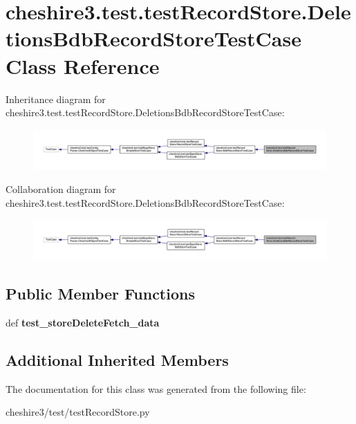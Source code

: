 \hypertarget{classcheshire3_1_1test_1_1test_record_store_1_1_deletions_bdb_record_store_test_case}{\section{cheshire3.\-test.\-test\-Record\-Store.\-Deletions\-Bdb\-Record\-Store\-Test\-Case Class Reference}
\label{classcheshire3_1_1test_1_1test_record_store_1_1_deletions_bdb_record_store_test_case}
}


Inheritance diagram for cheshire3.\-test.\-test\-Record\-Store.\-Deletions\-Bdb\-Record\-Store\-Test\-Case\-:
\nopagebreak
\begin{figure}[H]
\begin{center}
\leavevmode
\includegraphics[width=350pt]{classcheshire3_1_1test_1_1test_record_store_1_1_deletions_bdb_record_store_test_case__inherit__graph}
\end{center}
\end{figure}


Collaboration diagram for cheshire3.\-test.\-test\-Record\-Store.\-Deletions\-Bdb\-Record\-Store\-Test\-Case\-:
\nopagebreak
\begin{figure}[H]
\begin{center}
\leavevmode
\includegraphics[width=350pt]{classcheshire3_1_1test_1_1test_record_store_1_1_deletions_bdb_record_store_test_case__coll__graph}
\end{center}
\end{figure}
\subsection*{Public Member Functions}
\begin{DoxyCompactItemize}
\item 
\hypertarget{classcheshire3_1_1test_1_1test_record_store_1_1_deletions_bdb_record_store_test_case_a5289f2e6b3095a55f48cbab76e3665aa}{def {\bfseries test\-\_\-store\-Delete\-Fetch\-\_\-data}}\label{classcheshire3_1_1test_1_1test_record_store_1_1_deletions_bdb_record_store_test_case_a5289f2e6b3095a55f48cbab76e3665aa}

\end{DoxyCompactItemize}
\subsection*{Additional Inherited Members}


The documentation for this class was generated from the following file\-:\begin{DoxyCompactItemize}
\item 
cheshire3/test/test\-Record\-Store.\-py\end{DoxyCompactItemize}
